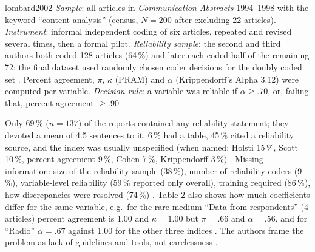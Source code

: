 \begin{papercard}{lombard2002}
 \emph{Sample}: all articles in \emph{Communication Abstracts} 1994--1998 with the keyword ``content analysis'' (census, $N=200$ after excluding 22 articles). \emph{Instrument}: informal independent coding of six articles, repeated and revised several times, then a formal pilot. \emph{Reliability sample}: the second and third authors both coded 128 articles (64\,\%) and later each coded half of the remaining 72; the final dataset used randomly chosen coder decisions for the doubly coded set . Percent agreement, $\pi$, $\kappa$ (PRAM) and $\alpha$ (Krippendorff's Alpha 3.12) were computed per variable. \emph{Decision rule}: a variable was reliable if $\alpha\ge.70$, or, failing that, percent agreement $\ge.90$ .

 Only 69\,\% ($n=137$) of the reports contained any reliability statement; they devoted a mean of 4.5 sentences to it, 6\,\% had a table, 45\,\% cited a reliability source, and the index was usually unspecified (when named: Holsti 15\,\%, Scott 10\,\%, percent agreement 9\,\%, Cohen 7\,\%, Krippendorff 3\,\%) . Missing information: size of the reliability sample (38\,\%), number of reliability coders (9\,\%), variable-level reliability (59\,\% reported only overall), training required (86\,\%), how discrepancies were resolved (74\,\%) . Table 2 also shows how much coefficients differ for the same variable, e.g.\ for the rare medium ``Data from respondents'' (4 articles) percent agreement is 1.00 and $\kappa=1.00$ but $\pi=.66$ and $\alpha=.56$, and for ``Radio'' $\alpha=.67$ against 1.00 for the other three indices . The authors frame the problem as lack of guidelines and tools, not carelessness .


\end{papercard}

